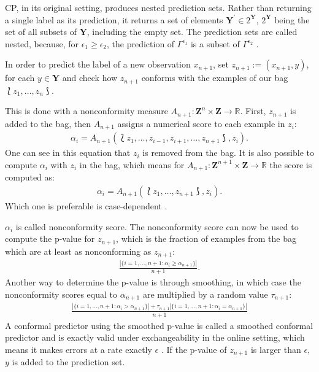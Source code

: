 \documentclass[twoside,11pt]{article}
\begin{document}
CP, in its original setting, produces nested prediction
sets. Rather than returning a single label as its
prediction, it returns a set of elements
$\textbf{Y}^\prime \in 2^{\textbf{Y}}$, $2^{\textbf{Y}}$
being the set of all subsets of $\textbf{Y}$, including the
empty set.
The prediction sets are called nested, because, for
$\epsilon_1 \geq \epsilon_2$, the prediction of
$\Gamma^{\epsilon_1}$ is a subset of $\Gamma^{\epsilon_2}$
\citep[see][Chapter 2]{alrw}.

In order to predict the label of a new observation
$x_{n+1}$, set $z_{n+1}:=(x_{n+1}, y)$, for each
$y \in \textbf{Y}$ and check how $z_{n+1}$ conforms with
the examples of our bag $\Lbag z_1,\dots,z_n \Rbag$.

This is done with a nonconformity measure
$A_{n+1}:\textbf{Z}^n \times \textbf{Z} \rightarrow
\mathbb{R}$. First, $z_{n+1}$ is added to the bag, then
$A_{n+1}$ assigns a numerical score to each example in
$z_i$:
\begin{align}
  \alpha_i = A_{n+1}(\Lbag z_1,\dots,z_{i-1},z_{i+1},
             \dots,z_{n+1} \Rbag, z_i).
\label{eq:a0}
\end{align}
One can see in this equation that $z_i$ is removed from the
bag. It is also possible to compute $\alpha_i$ with $z_i$
in the bag, which means for
$A_{n+1}:\textbf{Z}^{n+1} \times \textbf{Z} \rightarrow
\mathbb{R}$ the score is computed as:
\begin{align}
  \alpha_i = A_{n+1}(\Lbag z_1,\dots,z_{n+1} \Rbag, z_i).
\label{eq:a1}
\end{align}
Which one is preferable is case-dependent
\citep[see][Chapter 4.2.2]{shafer_et_al_2008}.

$\alpha_i$ is called nonconformity score.
The nonconformity score can now be used to compute the
p-value for $z_{n+1}$, which is the fraction of examples
from the bag which are at least as nonconforming as
$z_{n+1}$:
\begin{align}
  \frac{|\{i=1,\dots,n+1: \alpha_i \geq \alpha_{n+1}\}|}
       {n + 1}.
\label{eq:p0}
\end{align}
Another way to determine the p-value is through smoothing,
in which case the nonconformity scores equal to
$\alpha_{n+1}$ are multiplied by a random value
$\tau_{n+1}$:
\begin{align}
  \frac{|\{i=1,\dots,n+1: \alpha_i > \alpha_{n+1}\}|
    + \tau_{n+1} |\{i=1,\dots,n+1:\alpha_i=\alpha_{n+1}\}|}
       {n + 1}
\label{eq:p1}
\end{align}
A conformal predictor using the smoothed p-value is called
a smoothed conformal predictor and is exactly valid under
exchangeability in the online setting, which means it makes
errors at a rate exactly $\epsilon$
\citep[see][Chapter 2]{alrw}.
If the p-value of $z_{n+1}$ is larger than $\epsilon$, $y$
is added to the prediction set.
\end{document}
